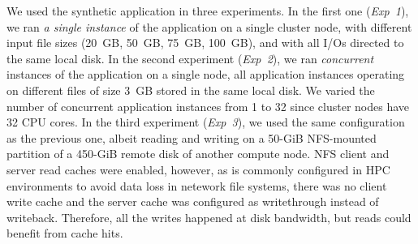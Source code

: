 \documentclass[conference]{IEEEtran}
\begin{document}
        We used the synthetic application in three experiments. In the
        first one (\textit{Exp~1}), we ran \emph{a single instance} of
        the application on a single cluster node, with different input file
        sizes (20~GB, 50~GB, 75~GB, 100~GB), and with all I/Os directed to
        the same local disk.
        In the second experiment (\textit{Exp~2}), we ran
        \emph{concurrent} instances of the application on a single node,
        all application instances operating on different files of size 3~GB
        stored in the same local disk. We varied the number of concurrent
        application instances from 1 to 32 since cluster nodes have 32 CPU
        cores.
        In the third experiment (\textit{Exp~3}), we used the same
        configuration as the previous one, albeit reading and writing
        on a 50-GiB NFS-mounted partition of a 450-GiB remote disk of
        another compute node. NFS client and server read caches were enabled, however, as is commonly configured in HPC
        environments to avoid data loss in netework file systems, there was no client write cache
        and the server cache was configured as writethrough instead of
        writeback.
        Therefore, all the writes happened at disk bandwidth, but
        reads could benefit from cache hits.
\end{document}
